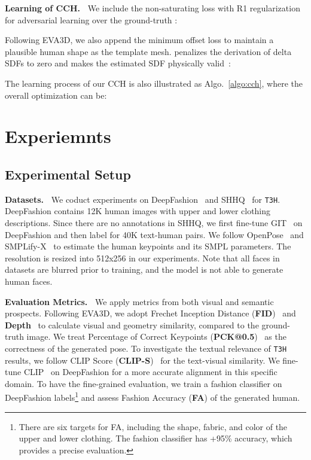 \documentclass[11pt]{article}
\begin{document}
\vspace{1ex} \noindent \textbf{Learning of CCH.~}
We include the non-saturating loss with R1 regularization~\cite{mescheder2018non-saturating} for adversarial learning over the ground-truth :

Following EVA3D, we also append the minimum offset loss  to maintain a plausible human shape as the template mesh.  penalizes the derivation of delta SDFs to zero and makes the estimated SDF physically valid~\cite{gropp2020sdf}:

The learning process of our CCH is also illustrated as Algo.~\ref{algo:cch}, where the overall optimization can be:


\section{Experiemnts}
\subsection{Experimental Setup}
\textbf{Datasets.~}
We coduct experiments on DeepFashion~\cite{jiang2022text2human} and SHHQ~\cite{fu2022shhq} for \texttt{T3H}. DeepFashion contains 12K human images with upper and lower clothing descriptions. Since there are no annotations in SHHQ, we first fine-tune GIT~\cite{wang2022git} on DeepFashion and then label for 40K text-human pairs. We follow OpenPose~\cite{cao2019open-pose} and SMPLify-X~\cite{pavlakos2019smplify-x} to estimate the human keypoints and its SMPL parameters. The resolution is resized into 512x256 in our experiments. Note that all faces in datasets are blurred prior to training, and the model is not able to generate human faces.

\vspace{1ex} \noindent \textbf{Evaluation Metrics.~}
We apply metrics from both visual and semantic prospects. Following EVA3D, we adopt Frechet Inception Distance (\textbf{FID})~\cite{heusel2017fid} and \textbf{Depth}~\cite{ranftl2020depth} to calculate visual and geometry similarity, compared to the ground-truth image. We treat Percentage of Correct Keypoints (\textbf{PCK@0.5})~\cite{andriluka2014pck} as the correctness of the generated pose. To investigate the textual relevance of \texttt{T3H} results, we follow CLIP Score (\textbf{CLIP-S})~\cite{hessel2021clip-s} for the text-visual similarity. We fine-tune CLIP~\cite{radford2021clip} on DeepFashion for a more accurate alignment in this specific domain. To have the fine-grained evaluation, we train a fashion classifier on DeepFashion labels\footnote{There are six targets for FA, including the shape, fabric, and color of the upper and lower clothing. The fashion classifier has +95\% accuracy, which provides a precise evaluation.} and assess Fashion Accuracy (\textbf{FA}) of the generated human.
\end{document}
